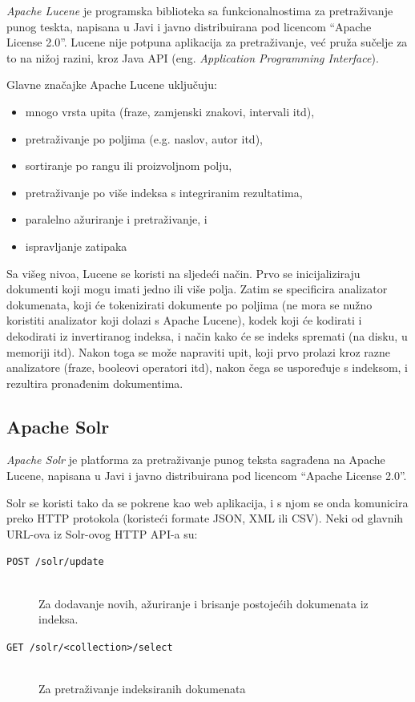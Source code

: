 \documentclass[a4paper,twoside,12pt]{scrreprt}
\begin{document}
\textit{Apache Lucene} je programska biblioteka sa funkcionalnostima za pretraživanje punog teskta, napisana u Javi i javno distribuirana pod licencom ``Apache License 2.0''. Lucene nije potpuna aplikacija za pretraživanje, već pruža sučelje za to na nižoj razini, kroz Java API (eng. \textit{Application Programming Interface}).

Glavne značajke Apache Lucene uključuju:

\begin{itemize}
  \item mnogo vrsta upita (fraze, zamjenski znakovi, intervali itd),
  \item pretraživanje po poljima (e.g. naslov, autor itd),
  \item sortiranje po rangu ili proizvoljnom polju,
  \item pretraživanje po više indeksa s integriranim rezultatima,
  \item paralelno ažuriranje i pretraživanje, i
  \item ispravljanje zatipaka
\end{itemize}

Sa višeg nivoa, Lucene se koristi na sljedeći način. Prvo se inicijaliziraju dokumenti koji mogu imati jedno ili više polja. Zatim se specificira analizator dokumenata, koji će tokenizirati dokumente po poljima (ne mora se nužno koristiti analizator koji dolazi s Apache Lucene), kodek koji će kodirati i dekodirati iz invertiranog indeksa, i način kako će se indeks spremati (na disku, u memoriji itd). Nakon toga se može napraviti upit, koji prvo prolazi kroz razne analizatore (fraze, booleovi operatori itd), nakon čega se uspoređuje s indeksom, i rezultira pronađenim dokumentima.

\subsection{Apache Solr}

\textit{Apache Solr} je platforma za pretraživanje punog teksta sagrađena na Apache Lucene, napisana u Javi i javno distribuirana pod licencom ``Apache License 2.0''.

Solr se koristi tako da se pokrene kao web aplikacija, i s njom se onda komunicira preko HTTP protokola (koristeći formate JSON, XML ili CSV). Neki od glavnih URL-ova iz Solr-ovog HTTP API-a su:

\begin{description}
  \item[\texttt{POST /solr/update}] \hfill \\ Za dodavanje novih, ažuriranje i brisanje postojećih dokumenata iz indeksa.
  \item[\texttt{GET /solr/<collection>/select}] \hfill \\ Za pretraživanje indeksiranih dokumenata
\end{description}
\end{document}
